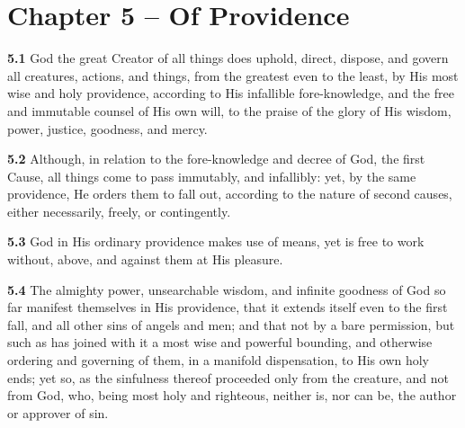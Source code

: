 \setcounter{footnote}{0} 
\setcounter{mgncount}{0}
\section{Chapter 5 -- Of Providence} 

\par\textbf{5.1} God the great Creator of all things does uphold, direct, dispose, and govern all creatures, actions, and things, from the greatest even to the least, by His most wise and holy providence, according to His infallible fore-knowledge, and the free and immutable counsel of His own will, to the praise of the glory of His wisdom, power, justice, goodness, and mercy.   

\par\textbf{5.2} Although, in relation to the fore-knowledge and decree of God, the first Cause, all things come to pass immutably, and infallibly: yet, by the same providence, He orders them to fall out, according to the nature of second causes, either necessarily, freely, or contingently.   

\par\textbf{5.3} God in His ordinary providence makes use of means, yet is free to work without, above, and against them at His pleasure.   

\par\textbf{5.4} The almighty power, unsearchable wisdom, and infinite goodness of God so far manifest themselves in His providence, that it extends itself even to the first fall, and all other sins of angels and men; and that not by a bare permission, but such as has joined with it a most wise and powerful bounding, and otherwise ordering and governing of them, in a manifold dispensation, to His own holy ends; yet so, as the sinfulness thereof proceeded only from the creature, and not from God, who, being most holy and righteous, neither is, nor can be, the author or approver of sin.

